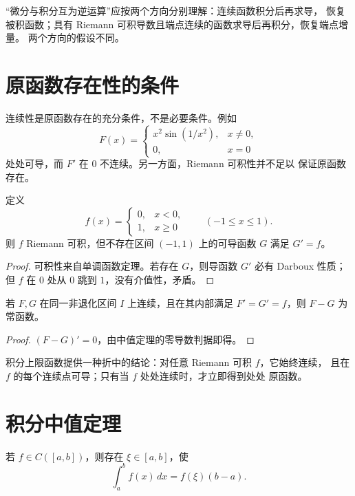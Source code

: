 “微分与积分互为逆运算”应按两个方向分别理解：连续函数积分后再求导，
恢复被积函数；具有 Riemann 可积导数且端点连续的函数求导后再积分，恢复端点增量。
两个方向的假设不同。

\section{原函数存在性的条件}

连续性是原函数存在的充分条件，不是必要条件。例如
\[
 F(x)=
 \begin{cases}
 x^2\sin(1/x^2),&x\ne0,\\
 0,&x=0
 \end{cases}
\]
处处可导，而 \(F'\) 在 \(0\) 不连续。另一方面，Riemann 可积性并不足以
保证原函数存在。

\begin{proposition}
\label{prop:integrable-no-antiderivative}
定义
\[
 f(x)=
 \begin{cases}
 0,&x<0,\\
 1,&x\ge0
 \end{cases}
\qquad(-1\le x\le1).
\]
则 \(f\) Riemann 可积，但不存在区间 \((-1,1)\) 上的可导函数
\(G\) 满足 \(G'=f\)。
\end{proposition}

\begin{proof}
可积性来自单调函数定理。若存在 \(G\)，则导函数 \(G'\) 必有 Darboux
性质；但 \(f\) 在 \(0\) 处从 \(0\) 跳到 \(1\)，没有介值性，矛盾。
\end{proof}

\begin{proposition}[原函数的唯一性]
若 \(F,G\) 在同一非退化区间 \(I\) 上连续，且在其内部满足
\(F'=G'=f\)，则 \(F-G\) 为常函数。
\end{proposition}

\begin{proof}
\((F-G)'=0\)，由中值定理的零导数判据即得。
\end{proof}

积分上限函数提供一种折中的结论：对任意 Riemann 可积 \(f\)，它始终连续，
且在 \(f\) 的每个连续点可导；只有当 \(f\) 处处连续时，才立即得到处处
原函数。

\section{积分中值定理}

\begin{theorem}[第一积分中值定理]
\label{thm:first-integral-mean-value}
若 \(f\in C([a,b])\)，则存在 \(\xi\in[a,b]\)，使
\[
 \int_a^b f(x)\,dx=f(\xi)(b-a).
\]
\end{theorem}

